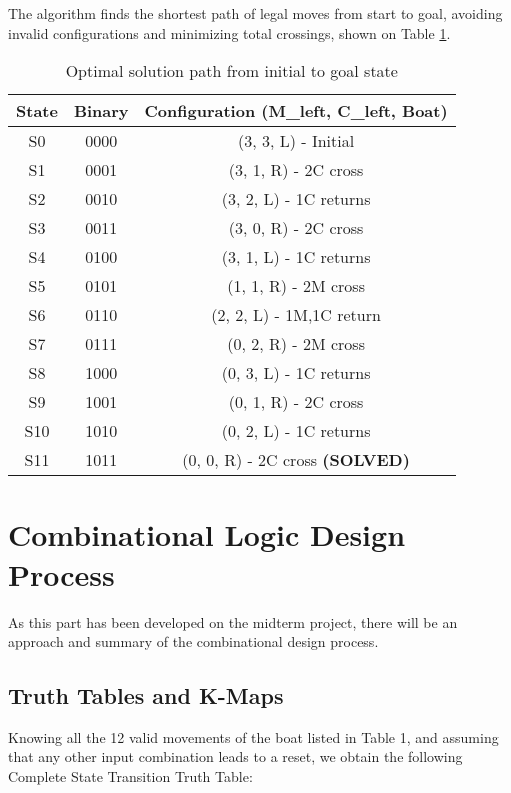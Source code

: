 \documentclass[10pt,a4paper]{article}
\begin{document}
The algorithm finds the shortest path of legal moves from start to goal, avoiding invalid configurations and minimizing total crossings, shown on Table \ref{solution}.

\begin{table}[h!]
\centering
\footnotesize
\begin{tabular}{|c|c|c|}
\hline
\textbf{State} & \textbf{Binary} & \textbf{Configuration (M\_left, C\_left, Boat)} \\
\hline
S0  & 0000 & (3, 3, L) - Initial \\
S1  & 0001 & (3, 1, R) - 2C cross \\
S2  & 0010 & (3, 2, L) - 1C returns \\
S3  & 0011 & (3, 0, R) - 2C cross \\
S4  & 0100 & (3, 1, L) - 1C returns \\
S5  & 0101 & (1, 1, R) - 2M cross \\
S6  & 0110 & (2, 2, L) - 1M,1C return \\
S7  & 0111 & (0, 2, R) - 2M cross \\
S8  & 1000 & (0, 3, L) - 1C returns \\
S9  & 1001 & (0, 1, R) - 2C cross \\
S10 & 1010 & (0, 2, L) - 1C returns \\
S11 & 1011 & (0, 0, R) - 2C cross \textbf{(SOLVED)} \\
\hline
\end{tabular}
\caption{Optimal solution path from initial to goal state}
\label{solution}
\end{table}




\section*{Combinational Logic Design Process}

\noindent As this part has been developed on the midterm project, there will be an approach and summary of the combinational design process.

\subsection*{Truth Tables and K-Maps}

\noindent Knowing all the 12 valid movements of the boat listed in Table 1, and assuming that any other input combination leads to a reset, we obtain the following Complete State Transition Truth Table:
\end{document}
